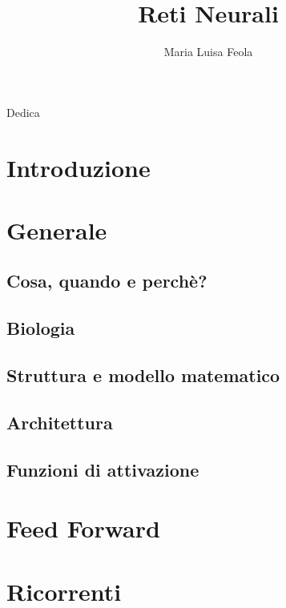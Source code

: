 \documentclass[12pt,a4paper,oneside]{book}
\author{Maria Luisa Feola}
\title{Reti Neurali}
\begin{document}
	
	\begin{flushright} %
		\null{}
		\thispagestyle{empty}
		Dedica
		\null
	\end{flushright}  %

	\tableofcontents
	\chapter*{Introduzione}
	\chapter{Generale}
		\section{Cosa, quando e perchè?}
		\section{Biologia}
		\section{Struttura e modello matematico}
		\section{Architettura}
		\section{Funzioni di attivazione}
	\chapter{Feed Forward}
	\chapter{Ricorrenti}
		
	
\end{document}
